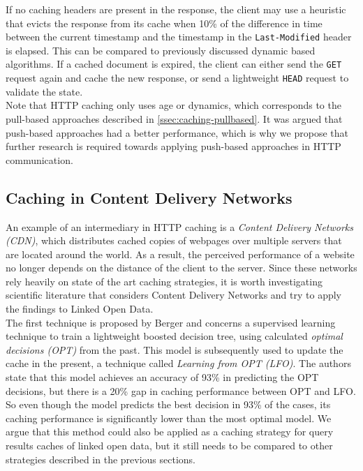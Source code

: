 \noindent If no caching headers are present in the response, the client may use a heuristic that evicts the response from its cache when 10\% of the difference in time between the current timestamp and the timestamp in the \texttt{Last-Modified} header is elapsed. This can be compared to previously discussed dynamic based algorithms. If a cached document is expired, the client can either send the \texttt{GET} request again and cache the new response, or send a lightweight \texttt{HEAD} request to validate the state.\\

\noindent Note that HTTP caching only uses age or dynamics, which corresponds to the pull-based approaches described in \cref{ssec:caching-pullbased}. It was argued that push-based approaches had a better performance, which is why we propose that further research is required towards applying push-based approaches in HTTP communication.

\clearpage

\subsection{Caching in Content Delivery Networks}
An example of an intermediary in HTTP caching is a \emph{Content Delivery Networks (CDN)}, which distributes cached copies of webpages over multiple servers that are located around the world. As a result, the perceived performance of a website no longer depends on the distance of the client to the server. Since these networks rely heavily on state of the art caching strategies, it is worth investigating scientific literature that considers Content Delivery Networks and try to apply the findings to Linked Open Data.\\

\noindent The first technique is proposed by Berger \cite{10.1145/3286062.3286082} and concerns a supervised learning technique to train a lightweight boosted decision tree, using calculated \emph{optimal decisions (OPT)} from the past. This model is subsequently used to update the cache in the present, a technique called \emph{Learning from OPT (LFO)}. The authors state that this model achieves an accuracy of 93\% in predicting the OPT decisions, but there is a 20\% gap in caching performance between OPT and LFO. So even though the model predicts the best decision in 93\% of the cases, its caching performance is significantly lower than the most optimal model. We argue that this method could also be applied as a caching strategy for query results caches of linked open data, but it still needs to be compared to other strategies described in the previous sections.\\

